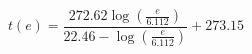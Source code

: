 \newcommand\logtmp{\log (\frac{e}{6.112})}
\[
  t(e) = \frac{272.62 \logtmp}{22.46 - \logtmp} + 273.15
\]
